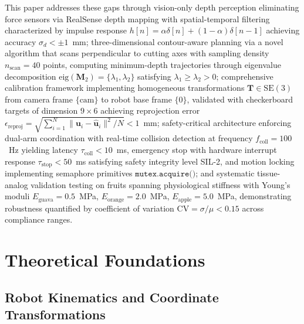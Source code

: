 \documentclass[journal]{IEEEtran}
\begin{document}
This paper addresses these gaps through vision-only depth perception eliminating force sensors via RealSense depth mapping with spatial-temporal filtering characterized by impulse response $h[n] = \alpha \delta[n] + (1-\alpha)\delta[n-1]$ achieving accuracy $\sigma_d < \pm 1$~mm; three-dimensional contour-aware planning via a novel algorithm that scans perpendicular to cutting axes with sampling density $n_{\text{scan}} = 40$ points, computing minimum-depth trajectories through eigenvalue decomposition $\text{eig}(\mathbf{M}_2) = \{\lambda_1, \lambda_2\}$ satisfying $\lambda_1 \geq \lambda_2 > 0$; comprehensive calibration framework implementing homogeneous transformations $\mathbf{T} \in \text{SE}(3)$ from camera frame $\{\text{cam}\}$ to robot base frame $\{0\}$, validated with checkerboard targets of dimension $9 \times 6$ achieving reprojection error $\epsilon_{\text{reproj}} = \sqrt{\sum_{i=1}^N \|\mathbf{u}_i - \hat{\mathbf{u}}_i\|^2 / N} < 1$~mm; safety-critical architecture enforcing dual-arm coordination with real-time collision detection at frequency $f_{\text{coll}} = 100$~Hz yielding latency $\tau_{\text{coll}} < 10$~ms, emergency stop with hardware interrupt response $\tau_{\text{stop}} < 50$~ms satisfying safety integrity level SIL-2, and motion locking implementing semaphore primitives $\texttt{mutex.acquire()}$; and systematic tissue-analog validation testing on fruits spanning physiological stiffness with Young's moduli $E_{\text{guava}} = 0.5$~MPa, $E_{\text{orange}} = 2.0$~MPa, $E_{\text{apple}} = 5.0$~MPa, demonstrating robustness quantified by coefficient of variation $\text{CV} = \sigma/\mu < 0.15$ across compliance ranges.

\section{Theoretical Foundations}

\subsection{Robot Kinematics and Coordinate Transformations}
\end{document}
